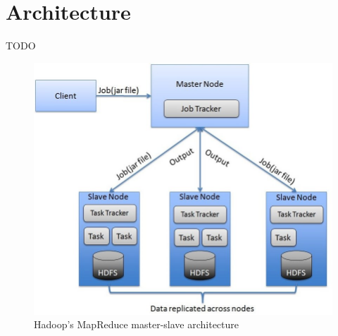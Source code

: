 \section{Architecture}
TODO

\begin{figure}[H]
    \centering
    \includegraphics[scale=0.45]{document/chapters/chapter_4/images/hadoop_master_slave_architecture.png}
    \caption{Hadoop's MapReduce master-slave architecture\cite{hadoop_map_reduce}}
    \label{fig:hadoop_master_slave_architecture}
\end{figure}